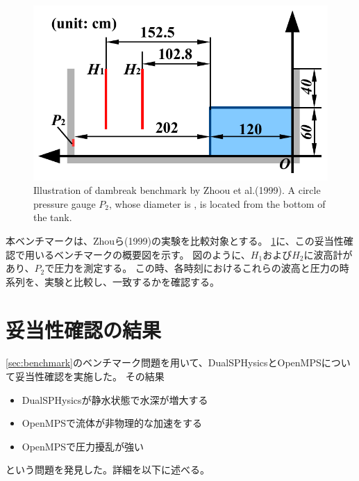 		\begin{figure} \centering
			\includegraphics[width=\linewidth, clip]{img/dambreak2.pdf}
			\caption{Illustration of dambreak benchmark by Zhoou et al.(1999). A circle pressure gauge $P_2$, whose diameter is , is located  from the bottom of the tank.\label{fig:dambreak2}}
		\end{figure}
		本ベンチマークは、Zhouら(1999)\Cite{ref:zhou1999}の実験を比較対象とする。
		\cref{fig:dambreak2}に、この妥当性確認で用いるベンチマークの概要図を示す。
		図のように、$H_1$および$H_2$に波高計があり、$P_2$で圧力を測定する。
		この時、各時刻におけるこれらの波高と圧力の時系列を、実験と比較し、一致するかを確認する。

\section{妥当性確認の結果 \label{sec:result}}
	\cref{sec:benchmark}のベンチマーク問題を用いて、DualSPHysicsとOpenMPSについて妥当性確認を実施した。
	その結果
	\begin{itemize}
		\item DualSPHysicsが静水状態で水深が増大する
		\item OpenMPSで流体が非物理的な加速をする
		\item OpenMPSで圧力擾乱が強い
	\end{itemize}
	という問題を発見した。詳細を以下に述べる。

